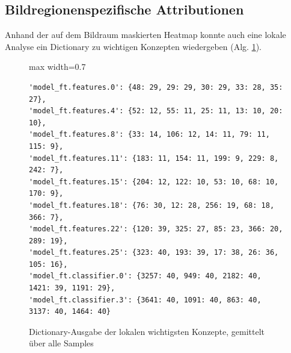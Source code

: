 \newpage
\subsection{Bildregionenspezifische Attributionen}
Anhand der auf dem Bildraum maskierten Heatmap konnte auch eine lokale Analyse ein Dictionary zu wichtigen Konzepten wiedergeben (Alg. \ref{verb:localoutput}).
\begin{figure}[ht!]
\begin{adjustbox}{max width=0.7\linewidth}
\begin{BVerbatim}
'model_ft.features.0': {48: 29, 29: 29, 30: 29, 33: 28, 35: 27},
'model_ft.features.4': {52: 12, 55: 11, 25: 11, 13: 10, 20: 10},
'model_ft.features.8': {33: 14, 106: 12, 14: 11, 79: 11, 115: 9},
'model_ft.features.11': {183: 11, 154: 11, 199: 9, 229: 8, 242: 7},
'model_ft.features.15': {204: 12, 122: 10, 53: 10, 68: 10, 170: 9},
'model_ft.features.18': {76: 30, 12: 28, 256: 19, 68: 18, 366: 7},
'model_ft.features.22': {120: 39, 325: 27, 85: 23, 366: 20, 289: 19},
'model_ft.features.25': {323: 40, 193: 39, 17: 38, 26: 36, 105: 16},
'model_ft.classifier.0': {3257: 40, 949: 40, 2182: 40, 1421: 39, 1191: 29},
'model_ft.classifier.3': {3641: 40, 1091: 40, 863: 40, 3137: 40, 1464: 40}
\end{BVerbatim}
\end{adjustbox}
    \caption{Dictionary-Ausgabe der lokalen wichtigsten Konzepte, gemittelt über alle Samples}
    \label{verb:localoutput}
\end{figure}